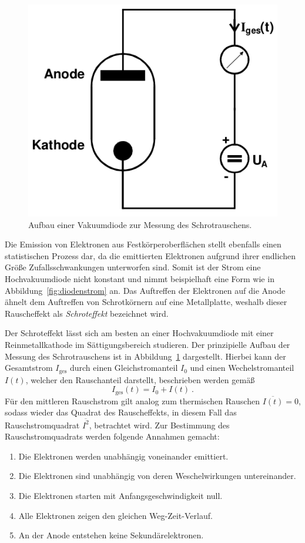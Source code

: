 \begin{figure}[htpb]
  \centering
  \includegraphics[scale=0.3]{bilder/diode.png}
  \caption{Aufbau einer Vakuumdiode zur Messung des Schrotrauschens.}
\label{fig:diode}
\end{figure}

Die Emission von Elektronen aus Festkörperoberflächen stellt ebenfalls einen
statistischen Prozess dar, da die emittierten Elektronen aufgrund ihrer
endlichen Größe Zufallsschwankungen unterworfen sind.
Somit ist der Strom eine Hochvakuumdiode nicht konstant und nimmt beispielhaft
eine Form wie in Abbildung~\ref{fig:diodenstrom} an.
Das Auftreffen der Elektronen auf die Anode ähnelt dem Auftreffen von
Schrotkörnern auf eine Metallplatte, weshalb dieser Rauscheffekt als
\emph{Schroteffekt} bezeichnet wird.

Der Schroteffekt lässt sich am besten an einer Hochvakuumdiode mit einer
Reinmetallkathode im Sättigungsbereich studieren.
Der prinzipielle Aufbau der Messung des Schrotrauschens ist in
Abbildung~\ref{fig:diode} dargestellt.
Hierbei kann der Gesamtstrom $I_\text{ges}$ durch einen Gleichstromanteil $I_0$
und einen Wechelstromanteil $I(t)$, welcher den Rauschanteil darstellt,
beschrieben werden gemäß
\begin{equation}
  I_\text{ges} (t) = I_0 + I(t)~.
\end{equation}
Für den mittleren Rauschstrom gilt analog zum thermischen Rauschen
$\overline{I(t)} = 0$, sodass wieder das Quadrat des Rauscheffekts, in diesem
Fall das Rauschstromquadrat $\overline{I^2}$, betrachtet wird.
Zur Bestimmung des Rauschstromquadrats werden folgende Annahmen gemacht:
\begin{enumerate}
  \item Die Elektronen werden unabhängig voneinander emittiert.
  \item Die Elektronen sind unabhängig von deren Weschelwirkungen
    untereinander.
  \item Die Elektronen starten mit Anfangsgeschwindigkeit null.
  \item Alle Elektronen zeigen den gleichen Weg-Zeit-Verlauf.
  \item An der Anode entstehen keine Sekundärelektronen.
\end{enumerate}

